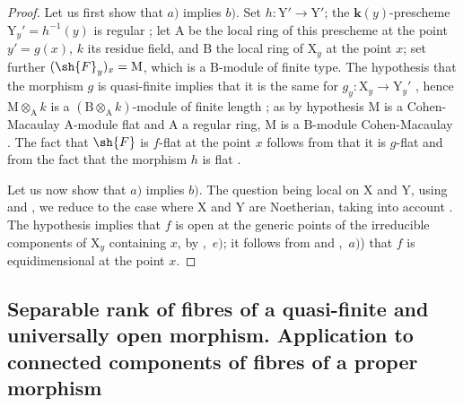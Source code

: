 \begin{proof}
\label{IV.15.4.3-proof}
Let us first show that $a)$ implies $b)$.
Set $h:\mathrm{Y}'\to\mathrm{Y}'$; the $\mathbf{k}(y)$-prescheme $\mathrm{Y}_y'=h^{-1}(y)$ is regular ; let $\mathrm{A}$ be the local ring of this prescheme at the point $y'=g(x)$, $k$ its residue field, and $\mathrm{B}$ the local ring of $\mathrm{X}_y$ at the point $x$; set further $(\sh{F}_y)_x=\mathrm{M}$, which is a $\mathrm{B}$-module of finite type.
The hypothesis that the morphism $g$ is quasi-finite implies that it is the same for $g_y:\mathrm{X}_y\to\mathrm{Y}_y'$ , hence $\mathrm{M}\otimes_\mathrm{A} k$ is a $(\mathrm{B}\otimes_\mathrm{A} k)$-module of finite length ; as by hypothesis $\mathrm{M}$ is a Cohen-Macaulay $\mathrm{A}$-module flat and $\mathrm{A}$ a regular ring, $\mathrm{M}$ is a $\mathrm{B}$-module Cohen-Macaulay .
The fact that $\sh{F}$ is $f$-flat at the point $x$ follows from that it is $g$-flat and from the fact that the morphism $h$ is flat .

Let us now show that $a)$ implies $b)$.
The question being local on $\mathrm{X}$ and $\mathrm{Y}$, using  and , we reduce to the case where $\mathrm{X}$ and $\mathrm{Y}$ are Noetherian, taking into account .
The hypothesis implies that $f$ is open at the generic points of the irreducible components of $\mathrm{X}_y$ containing $x$, by ,~$e)$; it follows from  and ,~$a)$) that $f$ is equidimensional at the point $x$.
\end{proof}
\subsection{Separable rank of fibres of a quasi-finite and universally open morphism. Application to connected components of fibres of a proper morphism}
\label{subsection:IV.15.5}


